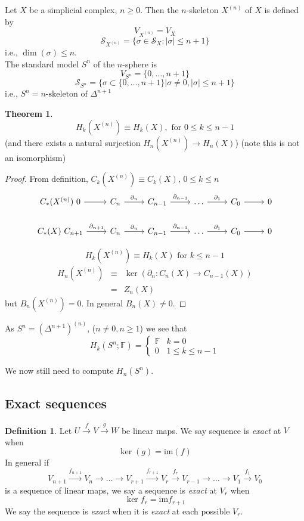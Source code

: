 \documentclass[a4paper,14pt]{extarticle}
\theoremstyle{definition}
\newtheorem*{theorem}{Theorem}
\newtheorem*{definition}{Definition}
\begin{document}
Let $X$ be a simplicial complex, $n\geq0$. Then the $n$-skeleton $X^{(n)}$ of $X$ is defined by 
\[V_{X^{(n)}}=V_X\] \[\mathcal{S}_{X^{(n)}}=\{\sigma\in\mathcal{S}_X:|\sigma|\leq n+1\}\]
i.e., $\dim(\sigma)\leq n$. \\

The standard model $S^n$ of the $n$-sphere is
\[V_{S^n}=\{0,\ldots,n+1\}\] \[\mathcal{S}_{S^n}=
\{\sigma\subset\{0,\ldots,n+1\}|\sigma\neq0, |\sigma|\leq n+1\}\]
i.e., $S^n=\text{$n$-skeleton of } \Delta^{n+1}$

\begin{theorem}
	\[H_k(X^{(n)})\equiv H_k(X),\text{ for }0\leq k\leq n-1\] (and there exists a natural surjection
	$H_n(X^{(n)})\rightarrow H_n(X)$) (note this is not an isomorphism)
\end{theorem}

\begin{proof}
	From definition, $C_k(X^{(n)})\equiv C_k(X), \,0\leq k\leq n$
	\[ \begin{tikzcd}
		C_*(X^{(n)})\,\,
		0 \arrow{r} & C_n \arrow{r}{\partial_n}  & C_{n-1} \arrow{r}{\partial_{n-1}} &
		\ldots \arrow{r}{\partial_1} & 
		C_0 \arrow{r} & 0  \\
		C_*(X)\,\,
		 C_{n+1} \arrow{r}{\partial_{n+1}} &
		C_n \arrow{r}{\partial_n} & C_{n-1} \arrow{r}{\partial_{n-1}} &
		\ldots \arrow{r}{\partial_1} & C_0 \arrow{r} & 0  
		\end{tikzcd}
	\]

	\[H_k(X^{(n)})\equiv H_k(X)\text{ for }k\leq n-1\]
	\begin{eqnarray*}
		H_n(X^{(n)})&\equiv&\ker(\partial_n:C_n(X)\rightarrow C_{n-1}(X)) \\
					&=&Z_n(X)
	\end{eqnarray*}
	 but $B_n(X^{(n)})=0$. In general $B_n(X)\neq 0$.
\end{proof}

As $S^n=(\Delta^{n+1})^{(n)}$, ($n\neq0, n\geq 1$) we see that 
\[H_k(S^n;\mathbb{F})=\begin{cases}\mathbb{F} & k=0 \\ 0 & 1\leq k\leq n-1\end{cases}\]

We now still need to compute $H_n(S^n)$.

\subsection{Exact sequences}
\begin{definition}
	Let $U\xrightarrow{f} V\xrightarrow{g} W$ be linear maps. We say sequence is \emph{exact} at $V$ when
	\[\ker(g)=\text{im}(f)\] In general if 
	\[V_{n+1}\xrightarrow{f_{n+1}} V_n\rightarrow\ldots
	\rightarrow V_{r+1}\xrightarrow{f_{r+1}} V_r
	\xrightarrow{f_r} V_{r-1}\rightarrow\ldots
	\rightarrow V_1\xrightarrow{f_1}V_0\] is a sequence 
	of linear maps, we say a sequence is \emph{exact} at $V_r$ when \[\ker f_r=\text{im} f_{r+1}\] We say the sequence is \emph{exact} when it is 
	\emph{exact} at each possible $V_r$.
\end{definition}
\end{document}
